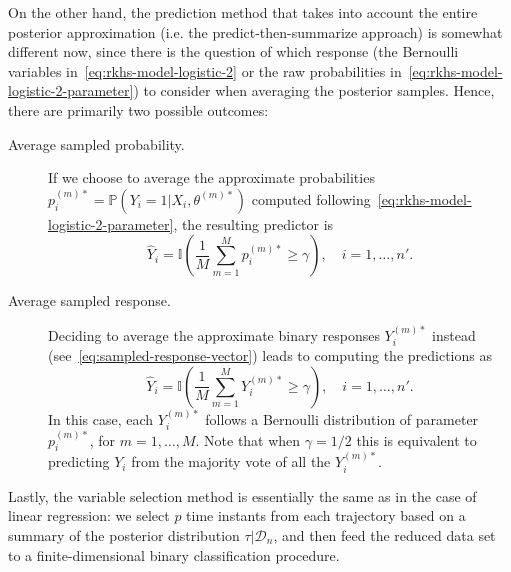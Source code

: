 On the other hand, the prediction method that takes into account the entire posterior approximation (i.e. the predict-then-summarize approach) is somewhat different now, since there is the question of which response (the Bernoulli variables in~\eqref{eq:rkhs-model-logistic-2} or the raw probabilities in~\eqref{eq:rkhs-model-logistic-2-parameter}) to consider when averaging the posterior samples. Hence, there are primarily two possible outcomes:
\begin{description}
  \item[Average sampled probability.] If we choose to average the approximate probabilities \(p_i^{(m)*} = \mathbb P(Y_i =1 | X_i,\theta^{(m)*})\) computed following~\eqref{eq:rkhs-model-logistic-2-parameter}, the resulting predictor is
  \[
    \hat Y_i = \mathbb I\left(\frac{1}{M} \sum_{m=1}^M p_i^{(m)*} \geq \gamma\right), \quad i=1,\dots,n'.
  \]
  \item[Average sampled response.] Deciding to average the approximate binary responses \(Y_i^{(m)*}\) instead (see~\eqref{eq:sampled-response-vector}) leads to computing the predictions as
\[
  \hat Y_i = \mathbb I\left(\frac{1}{M} \sum_{m=1}^M Y_i^{(m)*} \geq \gamma\right), \quad i=1,\dots,n'.
\]
In this case, each \(Y_i^{(m)*}\) follows a Bernoulli distribution of parameter \(p_i^{(m)*}\), for \(m=1,\dots,M\). Note that when \(\gamma=1/2\) this is equivalent to predicting \(Y_i\) from the majority vote of all the \(Y_i^{(m)*}\).
\end{description}

Lastly, the variable selection method is essentially the same as in the case of linear regression: we select \(p\) time instants from each trajectory based on a summary of the posterior distribution \(\tau | \mathcal D_n\), and then feed the reduced data set to a finite-dimensional binary classification procedure.
